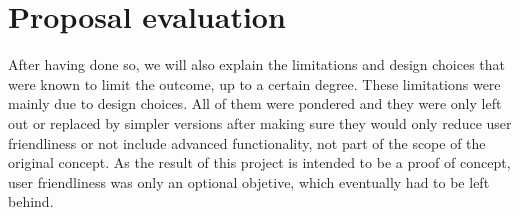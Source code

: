 \chapter{Proposal evaluation} \label{chap:eval}

After having done so, we will also explain the limitations and design choices that were known to limit the outcome, up to a certain degree.
These limitations were mainly due to design choices.
All of them were pondered and they were only left out or replaced by simpler versions after making sure they would only reduce user friendliness or not include advanced functionality, not part of the scope of the original concept.
As the result of this project is intended to be a proof of concept, user friendliness was only an optional objetive, which eventually had to be left behind.





